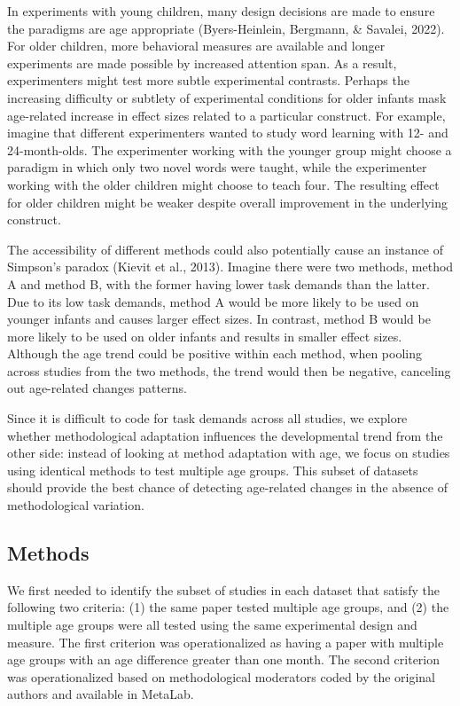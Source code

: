 \documentclass[
  man]{apa6}
\begin{document}
In experiments with young children, many design decisions are made to ensure the paradigms are age appropriate (Byers-Heinlein, Bergmann, \& Savalei, 2022). For older children, more behavioral measures are available and longer experiments are made possible by increased attention span. As a result, experimenters might test more subtle experimental contrasts. Perhaps the increasing difficulty or subtlety of experimental conditions for older infants mask age-related increase in effect sizes related to a particular construct. For example, imagine that different experimenters wanted to study word learning with 12- and 24-month-olds. The experimenter working with the younger group might choose a paradigm in which only two novel words were taught, while the experimenter working with the older children might choose to teach four. The resulting effect for older children might be weaker despite overall improvement in the underlying construct.

The accessibility of different methods could also potentially cause an instance of Simpson's paradox (Kievit et al., 2013). Imagine there were two methods, method A and method B, with the former having lower task demands than the latter. Due to its low task demands, method A would be more likely to be used on younger infants and causes larger effect sizes. In contrast, method B would be more likely to be used on older infants and results in smaller effect sizes. Although the age trend could be positive within each method, when pooling across studies from the two methods, the trend would then be negative, canceling out age-related changes patterns.

Since it is difficult to code for task demands across all studies, we explore whether methodological adaptation influences the developmental trend from the other side: instead of looking at method adaptation with age, we focus on studies using identical methods to test multiple age groups. This subset of datasets should provide the best chance of detecting age-related changes in the absence of methodological variation.

\hypertarget{methods-2}{%
\subsection{Methods}\label{methods-2}}

We first needed to identify the subset of studies in each dataset that satisfy the following two criteria: (1) the same paper tested multiple age groups, and (2) the multiple age groups were all tested using the same experimental design and measure. The first criterion was operationalized as having a paper with multiple age groups with an age difference greater than one month. The second criterion was operationalized based on methodological moderators coded by the original authors and available in MetaLab.
\end{document}
